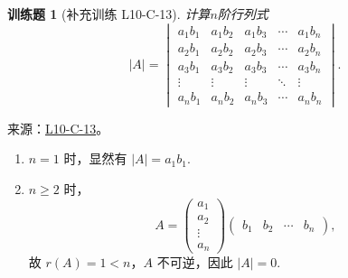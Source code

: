 \documentclass[12pt,fontset=fandol]{ctexart}
\newtheorem{exercise}{训练题}[section]
\begin{document}
\begin{exercise}[补充训练 L10-C-13]\label{prob:L10-C-13}
计算$n$阶行列式
        \[|A|=\begin{vmatrix}
                a_1b_1 & a_1b_2 & a_1b_3 & \cdots & a_1b_n \\
                a_2b_1 & a_2b_2 & a_2b_3 & \cdots & a_2b_n \\
                a_3b_1 & a_3b_2 & a_3b_3 & \cdots & a_3b_n \\
                \vdots & \vdots & \vdots & \ddots & \vdots \\
                a_nb_1 & a_nb_2 & a_nb_3 & \cdots & a_nb_n
            \end{vmatrix}.\]
\end{exercise}
\noindent 来源：\href{https://github.com/yhwu-is/Linear-Algebra-Left-Undone/blob/new/%E8%AE%B2%E4%B9%89/%E4%B8%93%E9%A2%98/10%20%E8%A1%8C%E5%88%97%E5%BC%8F.tex}{L10-C-13}。
\begin{solve}
\begin{enumerate}
                \item $n=1$ 时，显然有 $|A|=a_1b_1$.

                \item $n \geqslant 2$ 时，
                    \[
                        A = \begin{pmatrix}
                            a_1 \\ a_2 \\ \vdots \\ a_n
                        \end{pmatrix} \begin{pmatrix}
                            b_1 & b_2 & \cdots & b_n
                        \end{pmatrix},
                    \]
                    故 $r(A) = 1 < n$，$A$ 不可逆，因此 $|A| = 0$.
            \end{enumerate}
\end{solve}
\end{document}
